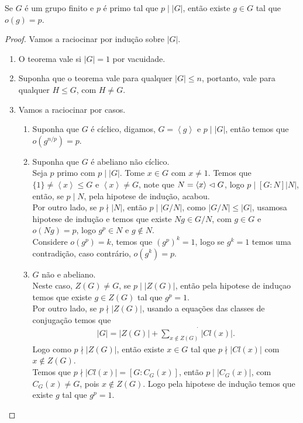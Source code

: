 \begin{theorem}
  Se $G$ é um grupo finito e $p$ é primo tal que $p\mid |G|$, então existe $g\in G$ tal que $o(g)=p$. 
\end{theorem}
\begin{proof} 
  Vamos a raciocinar por indução sobre $|G|$.\\
  \begin{enumerate}
    \item O teorema vale si $|G|=1$ por vacuidade.
    \item Suponha que o teorema vale para qualquer $|G|\leq n$, portanto, vale para qualquer $H\leq G$, com $H\neq G$.
    \item Vamos a raciocinar por casos.
    \begin{enumerate}
      \item Suponha que $G$ é cíclico, digamos, $G=\left\langle g \right\rangle$ e $p\mid |G|$, então temos que $o(g^{n/p})=p$.
      \item Suponha que $G$ é abeliano não cíclico.\\
        Seja $p$ primo com $p\mid |G|$. Tome $x\in G$ com $x\neq 1$. Temos que $\{1\}\neq \left\langle x \right\rangle\leq G$ e $\left\langle x \right\rangle\neq G$, note que $N=\left\langle x \right\rangle\vartriangleleft G$, logo $p\mid [G:N]|N|$, então, se $p\mid N$, pela hipotese de indução, acabou.\\
        Por outro lado, se $p\nmid |N|$, então $p\mid |G/N|$, como $|G/N|\leq |G|$, usamosa hipotese de indução e temos que existe $Ng\in G/N$, com $g\in G$ e $o(Ng)=p$, logo $g^{p}\in N$ e $g\notin N$.\\
        Considere $o(g^{p})=k$, temos que $(g^{p})^{k}=1$, logo se $g^{k}=1$ temos uma contradição, caso contrário, $o(g^k)=p$.
      \item $G$ não e abeliano.\\
        Neste caso, $Z(G)\neq G$, se $p\mid |Z(G)|$, então pela hipotese de induçao temos que existe $g\in Z(G)$ tal que $g^{p}=1$.\\
        Por outro lado, se $p\nmid |Z(G)|$, usando a equações das classes de conjugação temos que
        \begin{align*}
          |G|=|Z(G)|+\dot{\sum_{x\notin Z(G)}}|Cl(x)|.
        \end{align*}
        Logo como $p\nmid |Z(G)|$, então existe $x\in G$ tal que $p\nmid |Cl(x)|$ com $x\notin Z(G)$.\\
        Temos que $p\nmid |Cl(x)|=[G:C_{G}(x)]$, então $p\mid |C_{G}(x)|$, com $C_{G}(x)\neq G$, pois $x\notin Z(G)$. Logo pela hipotese de indução temos que existe $g$ tal que $g^{p}=1$. 
    \end{enumerate}
  \end{enumerate}
\end{proof}
